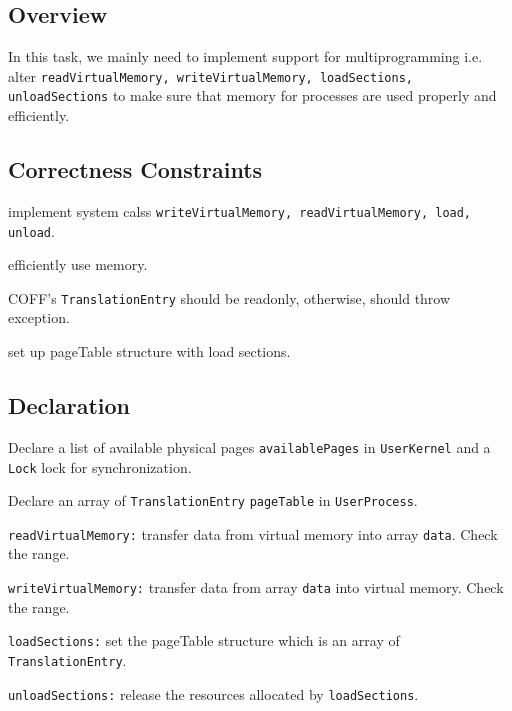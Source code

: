 \documentclass{article}
\begin{document}
\subsection{Overview}
In this task, we mainly need to implement support for multiprogramming i.e. alter \texttt{readVirtualMemory, writeVirtualMemory, loadSections,
unloadSections} to make sure that memory for processes are used properly and efficiently.
\subsection{Correctness Constraints}
\begin{compactitem}
\item implement system calss \texttt{writeVirtualMemory, readVirtualMemory, load, unload}.
\item efficiently use memory.
\item COFF's \texttt{TranslationEntry} should be readonly, otherwise, should throw exception.
\item set up pageTable structure with load sections.
\end{compactitem}
\subsection{Declaration}
\begin{compactitem}
\item Declare a list of available physical pages \texttt{availablePages} in \texttt{UserKernel} and a \texttt{Lock} lock for synchronization.
\item Declare an array of \texttt{TranslationEntry} \texttt{pageTable} in \texttt{UserProcess}.
\item \texttt{readVirtualMemory:} transfer data from virtual memory into array \texttt{data}. Check the range.
\item \texttt{writeVirtualMemory:} transfer data from array \texttt{data} into virtual memory. Check the range.
\item \texttt{loadSections:} set the pageTable structure which is an array of \texttt{TranslationEntry}.
\item \texttt{unloadSections:} release the resources allocated by \texttt{loadSections}.
\end{compactitem}
\end{document}
